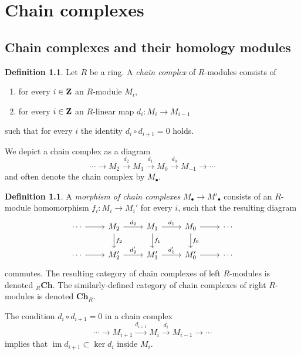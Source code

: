 \documentclass[11pt]{amsbook}
\newcommand{\longto}{\longrightarrow}
\DeclareMathOperator\im{im}
\def\Ch{\mathbf{Ch}}
\theoremstyle{plain}
\theoremstyle{definition}
\newtheorem{definition}[theorem]{Definition}
\begin{document}


\chapter{Chain complexes}

\section{Chain complexes and their homology modules}


\begin{definition}
Let $R$ be a ring. A \emph{chain complex} of $R$-modules consists of
\begin{enumerate}
\item for every $i\in {\mathbf{Z}}$ an $R$-module $M_i$,
\item for every $i\in {\mathbf{Z}}$ an $R$-linear map $d_i\colon M_i \to M_{i-1}$
\end{enumerate}
such that for every $i$ the identity $d_i \circ d_{i+1} = 0 $ holds.
\end{definition}

We depict a chain complex as a diagram
\[
	\cdots \longto M_2 \overset{d_2}{\longto} M_1 \overset{d_1}{\longto}  M_0 
	\overset{d_0}{\longto} M_{-1} \longto \cdots 
\]
and often denote the chain complex by $M_\bullet$.

\begin{definition}
A \emph{morphism of chain complexes} $M_\bullet \to M'_\bullet$ consists of an $R$-module
homomorphism $f_i\colon M_i \to M_i'$ for every $i$, such that the resulting diagram
\[
\begin{tikzcd}
\cdots \arrow{r}
	& M_{2} \arrow{r}{d_{2}} \arrow{d}{f_{2}} 
	& M_{1} \arrow{r}{d_{1}} \arrow{d}{f_{1}} 
	& M_{0} \arrow{r} \arrow{d}{f_{0}} 
	& \cdots \\
\cdots \arrow{r}
	& M'_{2} \arrow{r}{d'_{2}} 
	& M'_{1} \arrow{r}{d'_{1}} 
	& M'_{0} \arrow{r} 
	& \cdots 
\end{tikzcd}
\]
commutes.  The resulting category of chain complexes of left $R$-modules is denoted 
${}_R\Ch$. The similarly-defined category of chain complexes of right $R$-modules is denoted $\Ch_R$.
\end{definition}

The condition $d_i \circ d_{i+1} = 0$ in a chain complex
 \[
	\cdots \longto M_{i+1} \overset{d_{i+1}}{\longto} M_i \overset{d_i}{\longto}  M_{i-1}
	\longto \cdots
\]
implies that $\im d_{i+1} \subset \ker d_i$ inside $M_i$. 
\end{document}
